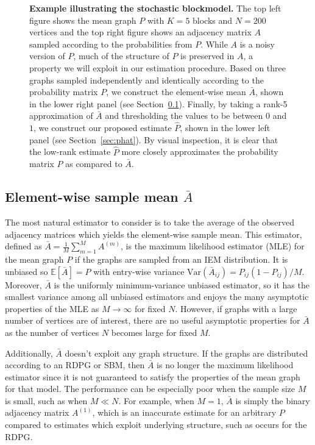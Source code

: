 \documentclass[10pt,letterpaper]{article}
\newcommand{\Ex}{\mathbb{E}}
\renewcommand{\hat}{\widehat}
\begin{document}
\begin{figure}
\begin{subfigure}{.45\textwidth}
\end{subfigure}
\caption{{\bf Example illustrating the stochastic blockmodel.}
The top left figure shows the mean graph $P$ with $K = 5$ blocks and $N=200$ vertices and the top right figure shows an adjacency matrix $A$ sampled according to the probabilities from $P$.
While $A$ is a noisy version of $P$, much of the structure of $P$ is preserved in $A$, a property we will exploit in our estimation procedure.
Based on three graphs sampled independently and identically according to the probability matrix $P$, we construct the element-wise mean $\bar{A}$, shown in the lower right panel (see Section~\ref{sec:abar}).  
Finally, by taking a rank-5 approximation of $\bar{A}$ and thresholding the values to be between $0$ and $1$, we construct our proposed estimate $\hat{P}$, shown in the lower left panel (see Section~\ref{sec:phat}).
By visual inspection, it is clear that the low-rank estimate $\hat{P}$ more closely approximates the probability matrix $P$ as compared to $\bar{A}$.
}
\label{fig:SBM_example}
\end{figure}


\subsection[Element-wise sample mean]{Element-wise sample mean $\bar{A}$}
\label{sec:abar}
The most natural estimator to consider is to take the average of the observed adjacency matrices which yields the element-wise sample mean.
This estimator, defined as $\bar{A}=\frac{1}{M}\sum_{m=1}^M A^{(m)}$, is the  maximum likelihood estimator (MLE) for the mean graph $P$ if the graphs are sampled from an IEM distribution.
It is unbiased so $\Ex[\bar{A}]=P$ with entry-wise variance $\mathrm{Var}(\bar{A}_{ij}) = P_{ij} (1-P_{ij})/M$. Moreover, $\bar{A}$ is the uniformly minimum-variance unbiased estimator, so it has the smallest variance among all unbiased estimators and enjoys the many asymptotic properties of the MLE as $M\to \infty$ for fixed $N$.
However, if graphs with a large number of vertices are of interest, there are no useful asymptotic properties for $\bar{A}$ as the number of vertices $N$ becomes large for fixed $M$.

Additionally, $\bar{A}$ doesn't exploit any graph structure.
If the graphs are distributed according to an RDPG or SBM, then $\bar{A}$ is no longer the maximum likelihood estimator since it is not guaranteed to satisfy the properties of the mean graph for that model.
The performance can be especially poor when the sample size $M$ is small, such as when $M\ll N$.
For example, when $M=1$, $\bar{A}$ is simply the binary adjacency matrix $A^{(1)}$, which is an inaccurate estimate for an arbitrary $P$ compared to estimates which exploit underlying structure, such as occurs for the RDPG.
\end{document}
